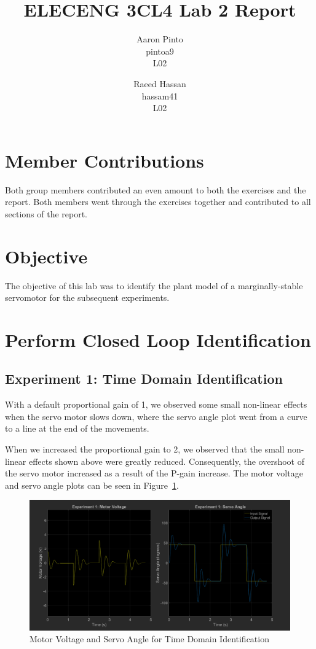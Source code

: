 \documentclass[12pt]{article}
\title{ELECENG 3CL4 Lab 2 Report}
\author{
    Aaron Pinto \\
    pintoa9 \\
    L02
    \and
    Raeed Hassan \\
    hassam41 \\
    L02
}
\begin{document}
\maketitle
\clearpage

\section*{Member Contributions}
Both group members contributed an even amount to both the exercises and the report. Both members went through the exercises together and contributed to all sections of the report.

\section*{Objective} %
The objective of this lab was to identify the plant model of a marginally-stable servomotor for the subsequent experiments.

\clearpage
\setcounter{section}{2}
\section{Perform Closed Loop Identification}
\subsection{Experiment 1: Time Domain Identification}
With a default proportional gain of 1, we observed some small non-linear effects when the servo motor slows down, where the servo angle plot went from a curve to a line at the end of the movements.

When we increased the proportional gain to 2, we observed that the small non-linear effects shown above were greatly reduced. Consequently, the overshoot of the servo motor increased as a result of the P-gain increase. The motor voltage and servo angle plots can be seen in Figure~\ref{fig:exp1}.
\begin{figure}[h!]
    \centering
    \includegraphics[width=\textwidth]{exp1}
    \caption{\label{fig:exp1}Motor Voltage and Servo Angle for Time Domain Identification}
\end{figure}
\end{document}
